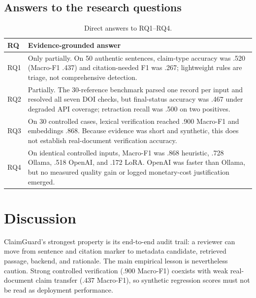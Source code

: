 \documentclass[12pt,toc=bib,toc=listof]{scrartcl}
\begin{document}
\subsection{Answers to the research questions}

\begin{table}[H]
\centering
\scriptsize
\begin{tabularx}{\textwidth}{@{}P{1cm}Y@{}}
\toprule
\textbf{RQ} & \textbf{Evidence-grounded answer} \\
\midrule
RQ1 & Only partially. On 50 authentic sentences, claim-type accuracy was .520 (Macro-F1 .437) and citation-needed F1 was .267; lightweight rules are triage, not comprehensive detection. \\
RQ2 & Partially. The 30-reference benchmark parsed one record per input and resolved all seven DOI checks, but final-status accuracy was .467 under degraded API coverage; retraction recall was .500 on two positives. \\
RQ3 & On 30 controlled cases, lexical verification reached .900 Macro-F1 and embeddings .868. Because evidence was short and synthetic, this does not establish real-document verification accuracy. \\
RQ4 & On identical controlled inputs, Macro-F1 was .868 heuristic, .728 Ollama, .518 OpenAI, and .172 LoRA. OpenAI was faster than Ollama, but no measured quality gain or logged monetary-cost justification emerged. \\
\bottomrule
\end{tabularx}
\caption{Direct answers to RQ1--RQ4.}
\label{tab:rq_answers}
\end{table}

\section{Discussion}

ClaimGuard's strongest property is its end-to-end audit trail: a reviewer can move from sentence and citation marker to metadata candidate, retrieved passage, backend, and rationale. The main empirical lesson is nevertheless caution. Strong controlled verification ($.900$ Macro-F1) coexists with weak real-document claim transfer ($.437$ Macro-F1), so synthetic regression scores must not be read as deployment performance.
\end{document}
